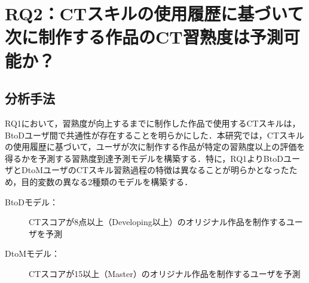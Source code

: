 \documentclass[submit,ses,noauthor]{ipsj}
\begin{document}



\section{RQ2：CTスキルの使用履歴に基づいて次に制作する作品のCT習熟度は予測可能か？}
\label{sec:rq2}

\subsection{分析手法}

RQ1において，習熟度が向上するまでに制作した作品で使用するCTスキルは，BtoDユーザ間で共通性が存在することを明らかにした．本研究では，CTスキルの使用履歴に基づいて，ユーザが次に制作する作品が特定の習熟度以上の評価を得るかを予測する習熟度到達予測モデルを構築する．特に，RQ1よりBtoDユーザとDtoMユーザのCTスキル習熟過程の特徴は異なることが明らかとなったため，目的変数の異なる2種類のモデルを構築する．
\begin{description}
\item [BtoDモデル：]CTスコアが8点以上（Developing以上）のオリジナル作品を制作するユーザを予測
\item [DtoMモデル：]CTスコアが15以上（Master）のオリジナル作品を制作するユーザを予測
\end{description}
\end{document}
